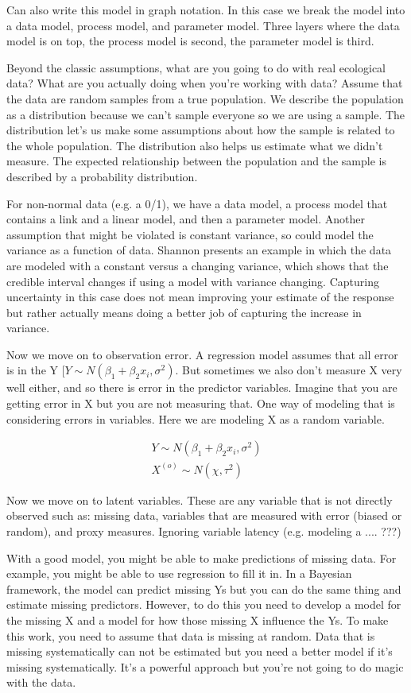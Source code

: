 \documentclass[12pt, oneside]{article}   	%
\begin{document}
Can also write this model in graph notation. In this case we break the model into a data model, process model, and parameter model. Three layers where the data model is on top, the process model is second, the parameter model is third. 
 
Beyond the classic assumptions, what are you going to do with real ecological data? What are you actually doing when you're working with data? Assume that the data are random samples from a true population. We describe the population as a distribution because we can't sample everyone so we are using a sample. The distribution let's us make some assumptions about how the sample is related to the whole population. The distribution also helps us estimate what we didn't measure. The expected relationship between the population and the sample is described by a probability distribution.
 
For non-normal data (e.g. a 0/1), we have a data model, a process model that contains a link and a linear model, and then a parameter model. Another assumption that might be violated is constant variance, so could model the variance as a function of data. Shannon presents an example in which the data are modeled with a constant versus a changing variance, which shows that the credible interval changes if using a model with variance changing. Capturing uncertainty in this case does not mean improving your estimate of the response but rather actually means doing a better job of capturing the increase in variance.

Now we move on to observation error. A regression model assumes that all error is in the Y [$Y \sim N(\beta_1 + \beta_2 x_i, \sigma^2)$. But sometimes we also don't measure X very well either, and so there is error in the predictor variables. Imagine that you are getting error in X but you are not measuring that. One way of modeling that is considering errors in variables. Here we are modeling X as a random variable.

 \begin{align}
Y \sim N(\beta_1 + \beta_2 x_i, \sigma^2) \\
X^{(o)} \sim N(\chi, \tau^2)
 \end{align}
 
Now we move on to latent variables. These are any variable that is not directly observed such as: missing data, variables that are measured with error (biased or random), and proxy measures. Ignoring variable latency (e.g. modeling a .... ???)

With a good model, you might be able to make predictions of missing data. For example, you might be able to use regression to fill it in. In a Bayesian framework, the model can predict missing Ys but you can do the same thing and estimate missing predictors. However, to do this you need to develop a model for the missing X and a model for how those missing X influence the Ys. To make this work, you need to assume that data is missing at random. Data that is missing systematically can not be estimated but you need a better model if it's missing systematically. It's a powerful approach but you're not going to do magic with the data. 
\end{document}
